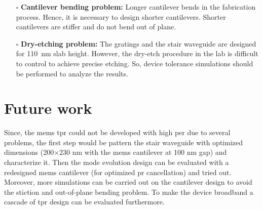 \documentclass[../report.tex]{subfiles}
\begin{document}
\begin{itemize}
	\item[$\square$] \textbf{Cantilever bending problem:} Longer cantilever bends in the fabrication process. Hence,  it is necessary to design shorter cantilevers. Shorter cantilevers are stiffer and do not bend out of plane.
	
	\item[$\square$] \textbf{Dry-etching problem:} The gratings and the stair waveguide are designed for \SI{110}{\nano \meter} slab height. However, the dry-etch procedure in the lab is difficult to control to achieve precise etching. So, device tolerance simulations should be performed to analyze the results.  
	
\end{itemize}
	
	\section{Future work} 
	Since, the \gls{mems} \gls{tpr} could not be developed with high \gls{per} due to several problems, the first step would be pattern the stair waveguide with optimized dimensions (200$\times$230 nm with the \gls{mems} cantilever at 100 nm gap) and characterize it. Then the mode evolution design can be evaluated with a redesigned \gls{mems} cantilever (for optimized \gls{pr} cancellation) and tried out. Moreover, more simulations can be carried out on the cantilever design to avoid the stiction and out-of-plane bending problem. To make the device broadband a cascade of \gls{tpr} design can be evaluated furthermore. 
	
\end{document}
